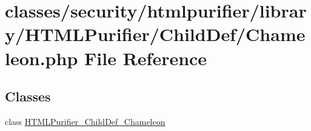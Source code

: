\hypertarget{Chameleon_8php}{\section{classes/security/htmlpurifier/library/\+H\+T\+M\+L\+Purifier/\+Child\+Def/\+Chameleon.php File Reference}
\label{Chameleon_8php}
}
\subsection*{Classes}
\begin{DoxyCompactItemize}
\item 
class \hyperlink{classHTMLPurifier__ChildDef__Chameleon}{H\+T\+M\+L\+Purifier\+\_\+\+Child\+Def\+\_\+\+Chameleon}
\end{DoxyCompactItemize}
